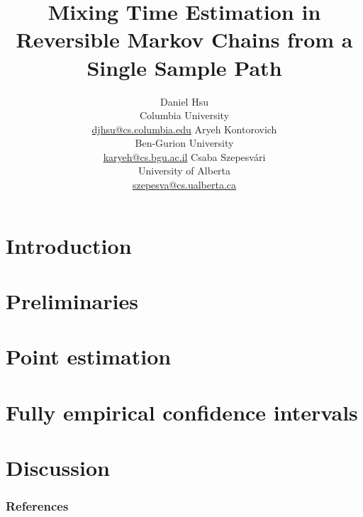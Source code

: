 \documentclass{article}
\title{%
  Mixing Time Estimation in Reversible Markov Chains from a Single
  Sample Path%
}
\author{%
  Daniel Hsu \\
  Columbia University \\
  \scriptsize{\url{djhsu@cs.columbia.edu}}
  \And
  Aryeh Kontorovich \\
  Ben-Gurion University \\
  \scriptsize{\url{karyeh@cs.bgu.ac.il}}
  \And
  Csaba Szepesv\'ari \\
  University of Alberta \\
  \scriptsize{\url{szepesva@cs.ualberta.ca}}
}
\begin{document}
\begin{bibunit}[myunsrt]
  \maketitle

  \begin{abstract} 
  
  \end{abstract} 

  \section{Introduction}\label{sec:intro}
  

  \section{Preliminaries}\label{sec:prelim}
  

  \section{Point estimation}\label{sec:rates}
  

  \section{Fully empirical confidence intervals}\label{sec:empirical}
  

  \section{Discussion}\label{sec:discussion}
  

  \subsubsection*{References}
  {\def\section*#1{}\small\putbib[all]}
\end{bibunit}

\appendix
\end{document}
